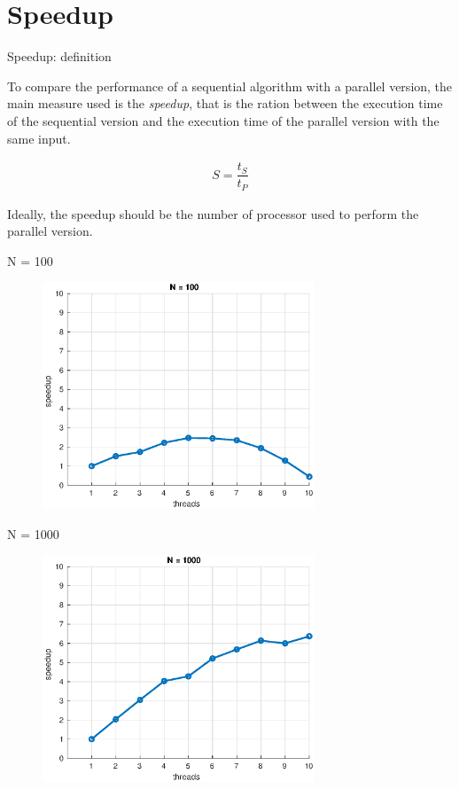 \documentclass{beamer}
\begin{document}
\section{Speedup}


\begin{frame}{Speedup: definition}

To compare the performance of a sequential algorithm with a parallel version, the main measure used is the \textit{speedup}, that is the ration between the execution time of the sequential version and the execution time of the parallel version with the same input.

\begin{align}
S = \dfrac{t_S}{t_P}
\end{align}

Ideally, the speedup should be the number of processor used to perform the parallel version.

\end{frame}


\begin{frame}{N = 100}

\begin{figure}[H]
\centering
\includegraphics[width=3.2in]{../Paper/fig/speedup100.eps}
\end{figure}

\end{frame}


\begin{frame}{N = 1000}

\begin{figure}[H]
\centering
\includegraphics[width=3.2in]{../Paper/fig/speedup1000.eps}
\end{figure}

\end{frame}
\end{document}
